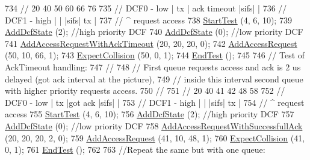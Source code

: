 \begin{DoxyCode}
734   \textcolor{comment}{//            20           40      50     60  66      76}
735   \textcolor{comment}{// DCF0 - low  |     tx     | ack timeout |sifs|       |}
736   \textcolor{comment}{// DCF1 - high |                    |     |sifs|  tx   |}
737   \textcolor{comment}{//                                  ^ request access}
738   \hyperlink{classDcfManagerTest_a5e7a2ff4209e9602aea95d4efa51ae91}{StartTest} (4, 6, 10);
739   \hyperlink{classDcfManagerTest_ab48a072efc828fc250036b45c3db1832}{AddDcfState} (2); \textcolor{comment}{//high priority DCF}
740   \hyperlink{classDcfManagerTest_ab48a072efc828fc250036b45c3db1832}{AddDcfState} (0); \textcolor{comment}{//low priority DCF}
741   \hyperlink{classDcfManagerTest_aac77cbb3419f2760b9695e7b79353aed}{AddAccessRequestWithAckTimeout} (20, 20, 20, 0);
742   \hyperlink{classDcfManagerTest_a1f016026b88c036eed9ce87bfc32b71a}{AddAccessRequest} (50, 10, 66, 1);
743   \hyperlink{classDcfManagerTest_a1f78350a941a4ca0e28260c8f6390e45}{ExpectCollision} (50, 0, 1);
744   \hyperlink{classDcfManagerTest_acc78df96a60d77fdb57a9f93029dca6c}{EndTest} ();
745 
746   \textcolor{comment}{// Test of AckTimeout handling:}
747   \textcolor{comment}{//}
748   \textcolor{comment}{// First queue requests access and ack is 2 us delayed (got ack interval at the picture),}
749   \textcolor{comment}{// inside this interval second queue with higher priority requests access.}
750   \textcolor{comment}{//}
751   \textcolor{comment}{//            20           40  41   42    48      58}
752   \textcolor{comment}{// DCF0 - low  |     tx     |got ack |sifs|       |}
753   \textcolor{comment}{// DCF1 - high |                |    |sifs|  tx   |}
754   \textcolor{comment}{//                              ^ request access}
755   \hyperlink{classDcfManagerTest_a5e7a2ff4209e9602aea95d4efa51ae91}{StartTest} (4, 6, 10);
756   \hyperlink{classDcfManagerTest_ab48a072efc828fc250036b45c3db1832}{AddDcfState} (2); \textcolor{comment}{//high priority DCF}
757   \hyperlink{classDcfManagerTest_ab48a072efc828fc250036b45c3db1832}{AddDcfState} (0); \textcolor{comment}{//low priority DCF}
758   \hyperlink{classDcfManagerTest_a98a7afae46c656a90246728368e2816a}{AddAccessRequestWithSuccessfullAck} (20, 20, 20, 2, 0);
759   \hyperlink{classDcfManagerTest_a1f016026b88c036eed9ce87bfc32b71a}{AddAccessRequest} (41, 10, 48, 1);
760   \hyperlink{classDcfManagerTest_a1f78350a941a4ca0e28260c8f6390e45}{ExpectCollision} (41, 0, 1);
761   \hyperlink{classDcfManagerTest_acc78df96a60d77fdb57a9f93029dca6c}{EndTest} ();
762 
763   \textcolor{comment}{//Repeat the same but with one queue:}

\end{DoxyCode}
